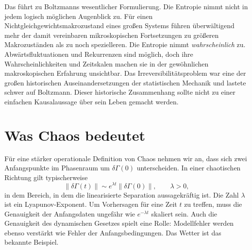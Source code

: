 \begin{classroomqa}
\end{classroomqa}

Das führt zu Boltzmanns wesentlicher Formulierung. Die Entropie nimmt nicht in jedem logisch möglichen Augenblick zu. Für einen Nichtgleichgewichtsmakrozustand eines großen Systems führen überwältigend mehr der damit vereinbaren mikroskopischen Fortsetzungen zu größeren Makrozuständen als zu noch spezielleren. Die Entropie nimmt \emph{wahrscheinlich} zu. Abwärtsfluktuationen und Rekurrenzen sind möglich, doch ihre Wahrscheinlichkeiten und Zeitskalen machen sie in der gewöhnlichen makroskopischen Erfahrung unsichtbar. Das Irreversibilitätsproblem war eine der großen historischen Auseinandersetzungen der statistischen Mechanik und lastete schwer auf Boltzmann. Dieser historische Zusammenhang sollte nicht zu einer einfachen Kausalaussage über sein Leben gemacht werden.

\section{Was Chaos bedeutet}

Für eine stärker operationale Definition von Chaos nehmen wir an, dass sich zwei Anfangspunkte im Phasenraum um \(\delta\Gamma(0)\) unterscheiden. In einer chaotischen Richtung gilt typischerweise
\begin{equation}
 \lVert\delta\Gamma(t)\rVert
 \sim e^{\lambda t}\lVert\delta\Gamma(0)\rVert,
 \qquad \lambda>0,
 \label{eq:sm7-lyapunov-growth}
\end{equation}
in dem Bereich, in dem die linearisierte Separation aussagekräftig ist. Die Zahl \(\lambda\) ist ein Lyapunov-Exponent. Um Vorhersagen für eine Zeit \(t\) zu treffen, muss die Genauigkeit der Anfangsdaten ungefähr wie \(e^{-\lambda t}\) skaliert sein. Auch die Genauigkeit des dynamischen Gesetzes spielt eine Rolle: Modellfehler werden ebenso verstärkt wie Fehler der Anfangsbedingungen. Das Wetter ist das bekannte Beispiel.

